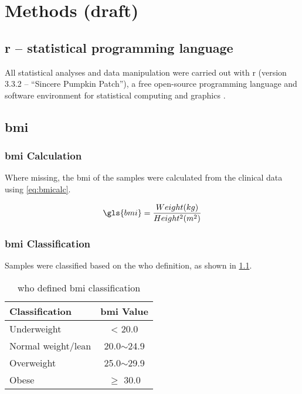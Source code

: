 \chapter{Methods (draft)}
\label{ch:methods}

\section{\gls{r} -- statistical programming language}
\label{sec:r}

All statistical analyses and data manipulation were carried out with \gls{r} (version 3.3.2 -- ``Sincere Pumpkin Patch''), a free open-source programming language and software environment for statistical computing and graphics \citep{R2016}.

\section{\Gls{bmi}}
\label{sec:bmi}

\subsection{\gls{bmi} Calculation}
\label{subsec:bmicalc}

Where missing, the \gls{bmi} of the samples were calculated from the clinical data using \cref{eq:bmicalc}.

\begin{equation}
	\label{eq:bmicalc}
	\gls{bmi} = \frac{Weight (kg)}{Height^2(m^2)}\\
\end{equation}

\subsection{\gls{bmi} Classification}
\label{subsec:bmiclassification}

Samples were classified based on the \gls{who} definition, as shown in \cref{tab:whobmiclass}.
\begin{table}[htb]
	\caption{\gls{who} defined \gls{bmi} classification}
	\label{tab:whobmiclass}
	\begin{center}
		\begin{tabular}{lc}
			Classification & \gls{bmi} Value\\
			\hline
			\rule{0pt}{2.25ex}Underweight & \textless{} 20.0\\
			Normal weight/lean & 20.0$\sim$24.9\\
			Overweight & 25.0$\sim$29.9\\
			Obese & $\geq{}$ 30.0\\
			\hline
			\hline
		\end{tabular}
	\end{center}
\end{table}

